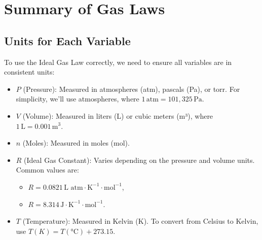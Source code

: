 \documentclass{report}
\begin{document}
\section{Summary of Gas Laws}


\subsection{Units for Each Variable}
To use the Ideal Gas Law correctly, we need to ensure all variables are in consistent units:
\begin{itemize}
	\item \( P \) (Pressure): Measured in atmospheres (atm), pascals (Pa), or torr. For simplicity, we'll use atmospheres, where \(1 \, \text{atm} = 101{,}325 \, \text{Pa}\).
	\item \( V \) (Volume): Measured in liters (L) or cubic meters (m³), where \(1 \, \text{L} = 0.001 \, \text{m}^3\).
	\item \( n \) (Moles): Measured in moles (mol).
	\item \( R \) (Ideal Gas Constant): Varies depending on the pressure and volume units. Common values are:
	      \begin{itemize}
		      \item \( R = 0.0821 \, \text{L atm} \cdot \text{K}^{-1} \cdot \text{mol}^{-1} \),
		      \item \( R = 8.314 \, \text{J} \cdot \text{K}^{-1} \cdot \text{mol}^{-1} \).
	      \end{itemize}
	\item \( T \) (Temperature): Measured in Kelvin (K). To convert from Celsius to Kelvin, use \( T(K) = T(°\text{C}) + 273.15 \).
\end{itemize}
\end{document}
